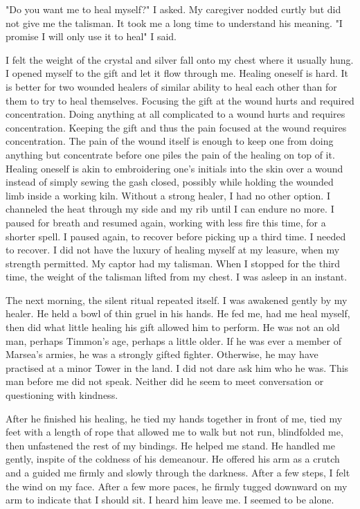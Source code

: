 \documentclass{article}
\begin{document}
"Do you want me to heal myself?" I asked. My caregiver nodded curtly but did not give me the talisman. It took me a long time to understand his meaning. "I promise I will only use it to heal" I said. 

I felt the weight of the crystal and silver fall onto my chest where it usually hung. I opened myself to the gift and let it flow through me. Healing oneself is hard. It is better for two wounded healers of similar ability to heal each other than for them to try to heal themselves. Focusing the gift at the wound hurts and required concentration. Doing anything at all complicated to a wound hurts and requires concentration. Keeping the gift and thus the pain focused at the wound requires concentration. The pain of the wound itself is enough to keep one from doing anything but concentrate before one piles the pain of the healing on top of it. Healing oneself is akin to embroidering one's initials into the skin over a wound instead of simply sewing the gash closed, possibly while holding the wounded limb inside a working kiln. Without a strong healer, I had no other option. I channeled the heat through my side and my rib until I can endure no more. I paused for breath and resumed again, working with less fire this time, for a shorter spell. I paused again, to recover before picking up a third time. I needed to recover. I did not have the luxury of healing myself at my leasure, when my strength permitted. My captor had my talisman. When I stopped for the third time, the weight of the talisman lifted from my chest. I was asleep in an instant.

The next morning, the silent ritual repeated itself. I was awakened gently by my healer. He held a bowl of thin gruel in his hands. He fed me, had me heal myself, then did what little healing his gift allowed him to perform. He was not an old man, perhaps Timmon's age, perhaps a little older. If he was ever a member of Marsea's armies, he was a strongly gifted fighter. Otherwise, he may have practised at a minor Tower in the land. I did not dare ask him who he was. This man before me did not speak. Neither did he seem to meet conversation or questioning with kindness. 

After he finished his healing, he tied my hands together in front of me, tied my feet with a length of rope that allowed me to walk but not run, blindfolded me, then unfastened the rest of my bindings. He helped me stand. He handled me gently, inspite of the coldness of his demeanour. He offered his arm as a crutch and a guided me firmly and slowly through the darkness. After a few steps, I felt the wind on my face. After a few more paces, he firmly tugged downward on my arm to indicate that I should sit. I heard him leave me. I seemed to be alone.
\end{document}
